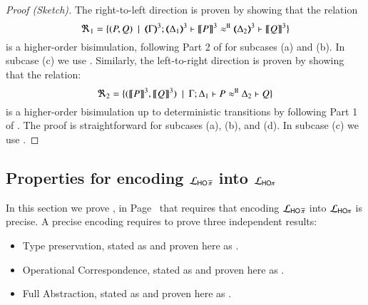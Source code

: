 \begin{proof}[Proof (Sketch)] The right-to-left direction is proven by 
	showing that
	the relation
%
	\[
		\Re_1 = \set{
		(P,Q)
		\setbar \horel{\tmap{\Gamma}{3}}{\tmap{\Delta_1}{3}}{\pmap{P}{3}}{\hwb}{\tmap{\Delta_2}{3}}{\pmap{Q}{3}}}
	\]
%
	  is a higher-order bisimulation, following Part 2 of
		 for subcases (a) and (b).
		In subcase (c) we  use .
		Similarly, the left-to-right direction is proven by showing that 
the relation:
%
	\[
		\Re_2 = \{
		(\llbracket P\rrbracket^3, \llbracket Q\rrbracket^3)
		\ \ |\ \  \Gamma; \Delta_1 \vdash P \approx^\mathtt{H} \Delta_2 \vdash Q\}
	\]
 is a higher-order bisimulation up to deterministic transitions
		by following Part 1 of .
		The proof is straightforward for subcases (a), (b), and (d).
		In subcase (c) we  use  .
\end{proof}






\subsection{Properties for encoding $\mathcal{L}_{\mathsf{HO}\,{\widetilde{\pi}}}$ into $\mathcal{L}_{\mathsf{HO}\pi}$}
\label{app:pHOp_to_HOp}



In this section we prove , in Page~\pageref{f:enc:phopiptohopi}
that requires that encoding
$\mathcal{L}_{\mathsf{HO}\,{\widetilde{\pi}}}$ into $\mathcal{L}_{\mathsf{HO}\pi}$ is precise.
A precise encoding requires to prove three independent results:
\begin{itemize}
	\item	Type preservation, stated as  and proven here as .
	\item	Operational Correspondence, stated as  and proven here as .
	\item	Full Abstraction, stated as  and proven here  as .
\end{itemize}


